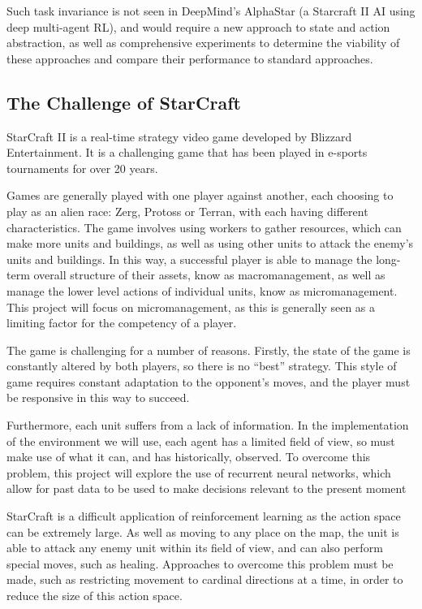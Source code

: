 Such task invariance is not seen in DeepMind's AlphaStar \cite{alphastar} (a Starcraft II AI using deep multi-agent RL), and would require a new approach to state and action abstraction, as well as comprehensive experiments to determine the viability of these approaches and compare their performance to standard approaches.


\subsection{The Challenge of StarCraft}

StarCraft II is a real-time strategy video game developed by Blizzard Entertainment. It is a challenging game that has been played in e-sports tournaments for over 20 years.

Games are generally played with one player against another, each choosing to play as an alien race: Zerg, Protoss or Terran, with each having different characteristics. The game involves using workers to gather resources, which can make more units and buildings, as well as using other units to attack the enemy's units and buildings. In this way, a successful player is able to manage the long-term overall structure of their assets, know as macromanagement, as well as manage the lower level actions of individual units, know as micromanagement. This project will focus on micromanagement, as this is generally seen as a limiting factor for the competency of a player.

The game is challenging for a number of reasons. Firstly, the state of the game is constantly altered by both players, so there is no ``best'' strategy. This style of game requires constant adaptation to the opponent's moves, and the player must be responsive in this way to succeed. 

Furthermore, each unit suffers from a lack of information. In the implementation of the environment we will use, each agent has a limited field of view, so must make use of what it can, and has historically, observed. To overcome this problem, this project will explore the use of recurrent neural networks, which allow for past data to be used to make decisions relevant to the present moment

StarCraft is a difficult application of reinforcement learning as the action space can be extremely large. As well as moving to any place on the map, the unit is able to attack any enemy unit within its field of view, and can also perform special moves, such as healing. Approaches to overcome this problem must be made, such as restricting movement to cardinal directions at a time, in order to reduce the size of this action space. 

